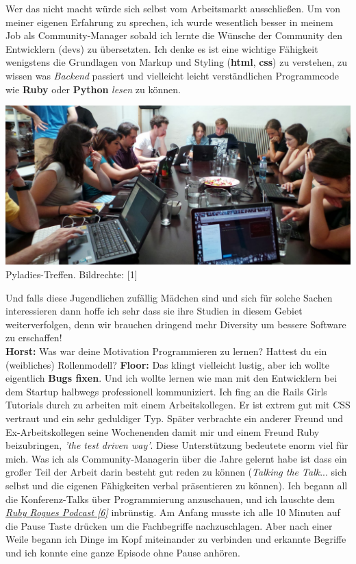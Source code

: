 Wer das nicht macht würde sich selbst vom Arbeitsmarkt ausschließen. Um von meiner eigenen Erfahrung zu sprechen, ich wurde wesentlich besser in meinem Job als Community-Manager sobald ich lernte die Wünsche der Community den Entwicklern (devs) zu übersetzten. Ich denke es ist eine  wichtige Fähigkeit wenigstens die Grundlagen von Markup und Styling (\textbf{html}, \textbf{css}) zu verstehen, zu wissen was \textit{Backend} passiert und vielleicht leicht verständlichen Programmcode wie \textbf{Ruby} oder \textbf{Python} \textit{lesen} zu können. 
\begin{center}
\includegraphics[width=\linewidth]{floor/floor5a.jpg} \\
\footnotesize{Pyladies-Treffen. Bildrechte: [1]} 
\end{center}
Und falls diese Jugendlichen zufällig Mädchen sind und sich für solche Sachen interessieren dann hoffe ich sehr dass sie ihre Studien in diesem Gebiet weiterverfolgen, denn wir brauchen dringend mehr Diversity um bessere Software zu erschaffen! \\
\textbf{Horst:} Was war deine Motivation Programmieren zu lernen? Hattest du ein (weibliches) Rollenmodell?
\textbf{Floor:} Das klingt vielleicht lustig, aber ich wollte eigentlich \textbf{Bugs fixen}. Und ich wollte lernen wie man mit den Entwicklern bei dem Startup halbwegs professionell kommuniziert. 
Ich fing an die Rails Girls Tutorials durch zu arbeiten mit einem Arbeitskollegen. Er ist extrem gut mit CSS vertraut und ein sehr geduldiger Typ. Später verbrachte ein anderer Freund und Ex-Arbeitskollegen seine Wochenenden damit mir und einem Freund Ruby beizubringen, \textit{'the test driven way'}. Diese Unterstützung bedeutete enorm viel für mich.
Was ich als Community-Managerin über die Jahre gelernt habe ist dass ein großer Teil der Arbeit darin besteht gut reden zu können (\textit{Talking the Talk}... sich selbst und die eigenen Fähigkeiten verbal präsentieren zu können). Ich begann all die Konferenz-Talks über Programmierung anzuschauen, und ich lauschte dem \href{http://rubyrogues.com/}{\textit{Ruby Rogues Podcast [6]}} inbrünstig. Am Anfang musste ich alle 10 Minuten auf die Pause Taste drücken um die Fachbegriffe nachzuschlagen. Aber nach einer Weile begann ich Dinge im Kopf miteinander zu verbinden und erkannte Begriffe und ich konnte eine ganze Episode ohne Pause anhören. 
